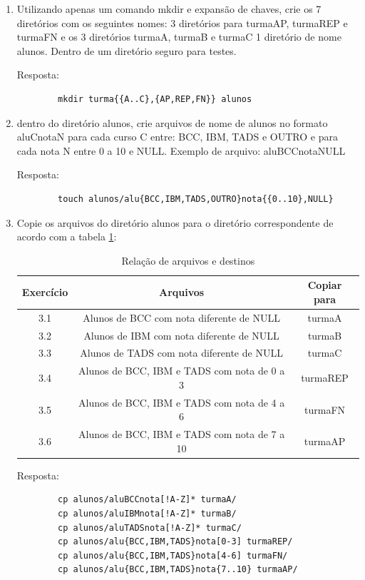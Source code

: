 \documentclass[oneside, 11 pt]{article}
\begin{document}
	\begin{enumerate}
		\item Utilizando apenas um comando mkdir e expansão de chaves, crie os 7 diretórios com os seguintes nomes: 3 diretórios para turmaAP, turmaREP e turmaFN e os 3 diretórios turmaA, turmaB e turmaC 1 diretório de nome alunos. Dentro de um diretório seguro para testes.
		
		Resposta:
		\begin{lstlisting}
		mkdir turma{{A..C},{AP,REP,FN}} alunos
		\end{lstlisting}
		\item dentro do diretório alunos, crie arquivos de nome de alunos no formato aluCnotaN para cada curso C entre: BCC, IBM, TADS e OUTRO e para cada nota N entre 0 a 10 e NULL. Exemplo de arquivo: aluBCCnotaNULL
		
		Resposta:
		\begin{lstlisting}
		touch alunos/alu{BCC,IBM,TADS,OUTRO}nota{{0..10},NULL}
		\end{lstlisting}
		\item Copie os arquivos do diretório alunos para o diretório correspondente de acordo com a tabela \ref{table:4}:
		
		\begin{table}[!ht]
			\centering
			\begin{tabular}{ | c | c | c | } 
				\hline
				\bfseries Exercício & \bfseries Arquivos & \bfseries Copiar para \\
				\hline
				3.1 & Alunos de BCC com nota diferente de NULL & turmaA \\
				\hline
				3.2 & Alunos de IBM com nota diferente de NULL & turmaB \\
				\hline
				3.3 & Alunos de TADS com nota diferente de NULL & turmaC \\
				\hline
				3.4 & Alunos de BCC, IBM e TADS com nota de 0 a 3 & turmaREP \\
				\hline
				3.5 & Alunos de BCC, IBM e TADS com nota de 4 a 6 & turmaFN \\
				\hline
				3.6 & Alunos de BCC, IBM e TADS com nota de 7 a 10 & turmaAP \\
				\hline
			\end{tabular}
			\caption{Relação de arquivos e destinos}
			\label{table:4}
		\end{table}
		Resposta:
		\begin{lstlisting}
		cp alunos/aluBCCnota[!A-Z]* turmaA/
		cp alunos/aluIBMnota[!A-Z]* turmaB/
		cp alunos/aluTADSnota[!A-Z]* turmaC/
		cp alunos/alu{BCC,IBM,TADS}nota[0-3] turmaREP/
		cp alunos/alu{BCC,IBM,TADS}nota[4-6] turmaFN/
		cp alunos/alu{BCC,IBM,TADS}nota{7..10} turmaAP/
		\end{lstlisting}
	\end{enumerate}
	
\end{document}
